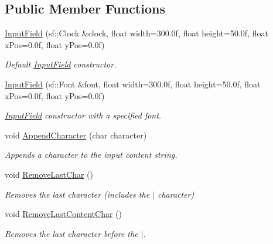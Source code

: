 \subsection*{Public Member Functions}
\begin{DoxyCompactItemize}
\item 
\mbox{\hyperlink{class_game_objects_1_1_input_field_a0a054047baaacb3610868aff6e111453}{Input\+Field}} (sf\+::\+Clock \&clock, float width=300.\+0f, float height=50.\+0f, float x\+Pos=0.\+0f, float y\+Pos=0.\+0f)
\begin{DoxyCompactList}\small\item\em Default \mbox{\hyperlink{class_game_objects_1_1_input_field}{Input\+Field}} constructor. \end{DoxyCompactList}\item 
\mbox{\hyperlink{class_game_objects_1_1_input_field_a82f424c00ccbf9409abb88d53b05fd68}{Input\+Field}} (sf\+::\+Font \&font, float width=300.\+0f, float height=50.\+0f, float x\+Pos=0.\+0f, float y\+Pos=0.\+0f)
\begin{DoxyCompactList}\small\item\em \mbox{\hyperlink{class_game_objects_1_1_input_field}{Input\+Field}} constructor with a specified font. \end{DoxyCompactList}\item 
void \mbox{\hyperlink{class_game_objects_1_1_input_field_a653823ab6e81ec4535f6807243c267ff}{Append\+Character}} (char character)
\begin{DoxyCompactList}\small\item\em Appends a character to the input content string. \end{DoxyCompactList}\item 
void \mbox{\hyperlink{class_game_objects_1_1_input_field_a517383656b3ac7f391a32b490ce3951a}{Remove\+Last\+Char}} ()
\begin{DoxyCompactList}\small\item\em Removes the last character (includes the \textquotesingle{}$\vert$\textquotesingle{} character) \end{DoxyCompactList}\item 
void \mbox{\hyperlink{class_game_objects_1_1_input_field_a4e7224efdb9d904915a9a7f288a9570a}{Remove\+Last\+Content\+Char}} ()
\begin{DoxyCompactList}\small\item\em Removes the last character before the \textquotesingle{}$\vert$\textquotesingle{}. \end{DoxyCompactList}\item 

\end{DoxyCompactItemize}
